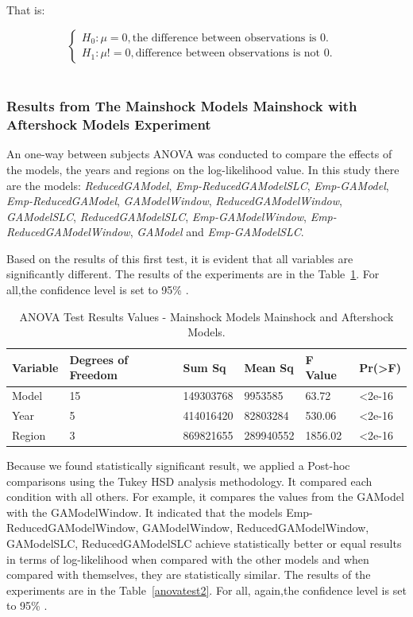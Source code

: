 That is:

$$\begin{cases}
H_0: \mu = 0, \text{the difference between observations is 0.}&\\
H_1: \mu != 0, \text{difference between observations is not 0.}
\end{cases}$$\\

\subsubsection{Results from The Mainshock Models Mainshock with Aftershock Models Experiment}\label{resultsBigExp}

An one-way between subjects ANOVA was conducted to compare the effects of the models, the years and regions on the log-likelihood value. In this study there are the models: \textit{ReducedGAModel}, \textit{Emp-ReducedGAModelSLC}, \textit{Emp-GAModel}, \textit{Emp-ReducedGAModel}, \textit{GAModelWindow}, \textit{ReducedGAModelWindow}, \textit{GAModelSLC}, \textit{ReducedGAModelSLC}, \textit{Emp-GAModelWindow}, \textit{Emp-ReducedGAModelWindow}, \textit{GAModel} and \textit{Emp-GAModelSLC}.

Based on the results of this first test, it is evident that all variables are significantly different. The results of the experiments are in the Table~\ref{anovatest1}. For all,the confidence level is set to 95\% .

\begin{table}[!htb]
	\centering
	\begin{tabular}{|l|l|l|l|l|l|}
		\hline
		{Variable} & {Degrees of Freedom} & {Sum Sq}    & {Mean Sq}   & {F Value} & {Pr(\textgreater F)} \\
		\hline
		Model    & 15           	  & 149303768  & 9953585   & 63.72    & \textless2e-16     \\
		\hline
		Year     & 5                  & 414016420  & 82803284  & 530.06   & \textless2e-16     \\
		\hline
		Region   & 3                  & 869821655  & 289940552  & 1856.02   & \textless2e-16	\\    
		\hline
	\end{tabular}
	\caption{ANOVA Test Results Values - Mainshock Models Mainshock and Aftershock Models.}
	\label{anovatest1}
\end{table}

Because we found statistically significant result, we applied a Post-hoc comparisons using the Tukey HSD analysis methodology. It compared each condition with all others. For example, it compares the values from the GAModel with the GAModelWindow. It indicated that the models Emp-ReducedGAModelWindow, GAModelWindow, ReducedGAModelWindow, GAModelSLC, ReducedGAModelSLC achieve statistically better or equal results in terms of log-likelihood when compared with the other models and when compared with themselves, they are statistically similar. The results of the experiments are in the Table~\ref{anovatest2}. For all, again,the confidence level is set to 95\% .
     
